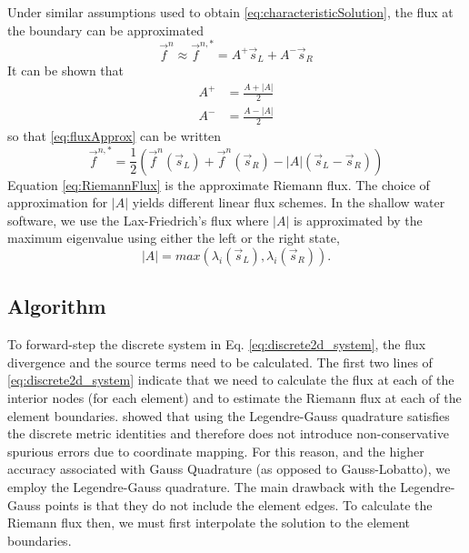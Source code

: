 \documentclass{softwaremanual}
\begin{document}
Under similar assumptions used to obtain \eqref{eq:characteristicSolution}, the flux at the boundary can be approximated
\begin{equation}
\vec{f}^n \approx \vec{f}^{n,*} = A^{+}\vec{s}_L + A^{-}\vec{s}_R  \label{eq:fluxApprox}
\end{equation}
It can be shown that
\begin{subequations}
\begin{align}
A^{+} &= \frac{A+|A|}{2} \\
A^{-} &= \frac{A-|A|}{2}
\end{align}
\end{subequations}
so that \eqref{eq:fluxApprox} can be written
\begin{equation}
\vec{f}^{n,*} = \frac{1}{2}\left( \vec{f}^n(\vec{s}_L) + \vec{f}^n(\vec{s}_R) -|A|(\vec{s}_L - \vec{s}_R) \right)\label{eq:RiemannFlux}
\end{equation}
Equation \eqref{eq:RiemannFlux} is the approximate Riemann flux. The choice of approximation for $|A|$ yields different linear flux schemes. In the shallow water software, we use the Lax-Friedrich's flux where $|A|$ is approximated by the maximum eigenvalue using either the left or the right state,
\begin{equation}
|A| = max( \lambda_i(\vec{s}_L), \lambda_i(\vec{s}_R) ).
\end{equation}

\subsection{Algorithm}

To forward-step the discrete system in Eq. \eqref{eq:discrete2d_system}, the flux divergence and the source terms need to be calculated. The first two lines of \eqref{eq:discrete2d_system} indicate that we need to calculate the flux at each of the interior nodes (for each element) and to estimate the Riemann flux at each of the element boundaries. \citep{Kopriva2009} showed that using the Legendre-Gauss quadrature satisfies the discrete metric identities and therefore does not introduce non-conservative spurious errors due to coordinate mapping. For this reason, and the higher accuracy associated with Gauss Quadrature (as opposed to Gauss-Lobatto), we employ the Legendre-Gauss quadrature. The main drawback with the Legendre-Gauss points is that they do not include the element edges. To calculate the Riemann flux then, we must first interpolate the solution to the element boundaries.
\end{document}
